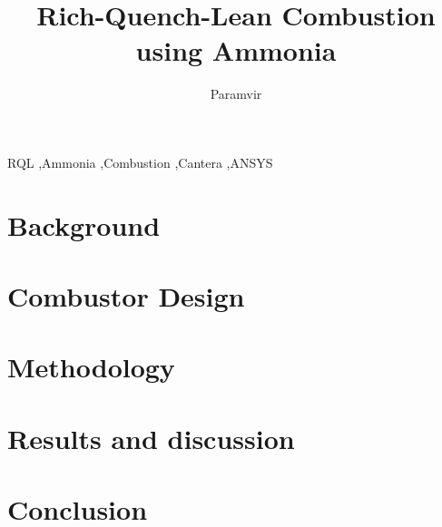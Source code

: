 \documentclass[review]{elsarticle}
\begin{document}
\begin{frontmatter}


\title{Rich-Quench-Lean Combustion using Ammonia }

\author[add1]{Paramvir }

\address[add1]{Department of Mechanical, Industrial and Aerospace Engineering, \\ Concordia University \\ Montreal, QC, Canada}

\begin{abstract}

\end{abstract}


\begin{keyword}
RQL \sep Ammonia \sep Combustion \sep Cantera \sep ANSYS
\end{keyword}

\end{frontmatter}
\linenumbers %


\section{Background}


\section{Combustor Design}


\section{Methodology}


\section{Results and discussion}


\section{Conclusion}


\clearpage





\clearpage


\end{document}
